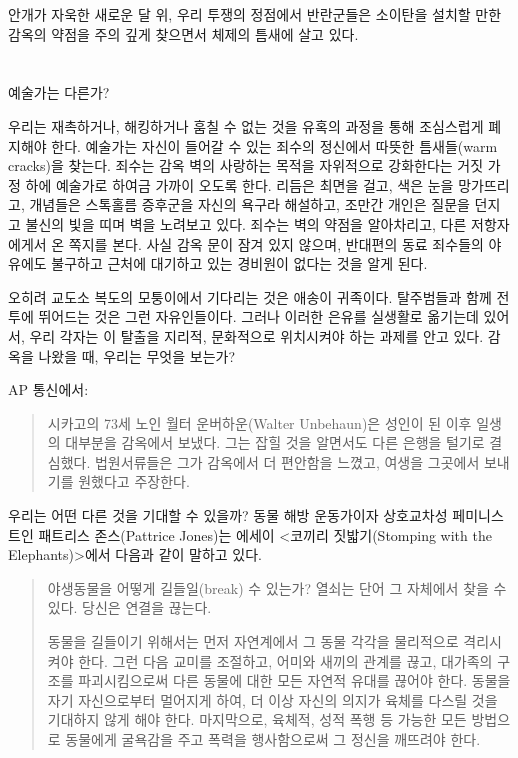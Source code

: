 \documentclass[10pt, b6paper, openany]{memoir}
\begin{document}
\begin{article}
안개가 자욱한 새로운 달 위, 우리 투쟁의 정점에서 반란군들은 소이탄을 설치할 만한 감옥의 약점을 주의 깊게 찾으면서 체제의 틈새에 살고 있다.

\section{}

예술가는 다른가?

우리는 재촉하거나, 해킹하거나 훔칠 수 없는 것을 유혹의 과정을 통해 조심스럽게 폐지해야 한다. 예술가는 자신이 들어갈 수 있는 죄수의 정신에서 따뜻한 틈새들(warm cracks)을 찾는다. 죄수는 감옥 벽의 사랑하는 목적을 자위적으로 강화한다는 거짓 가정 하에 예술가로 하여금 가까이 오도록 한다. 리듬은 최면을 걸고, 색은 눈을 망가뜨리고, 개념들은 스톡홀름 증후군을 자신의 욕구라 해설하고, 조만간 개인은 질문을 던지고 불신의 빛을 띠며 벽을 노려보고 있다. 죄수는 벽의 약점을 알아차리고, 다른 저항자에게서 온 쪽지를 본다. 사실 감옥 문이 잠겨 있지 않으며, 반대편의 동료 죄수들의 야유에도 불구하고 근처에 대기하고 있는 경비원이 없다는 것을 알게 된다. 

오히려 교도소 복도의 모퉁이에서 기다리는 것은 애송이 귀족이다. 탈주범들과 함께 전투에 뛰어드는 것은 그런 자유인들이다. 그러나 이러한 은유를 실생활로 옮기는데 있어서, 우리 각자는 이 탈출을 지리적, 문화적으로 위치시켜야 하는 과제를 안고 있다. 감옥을 나왔을 때, 우리는 무엇을 보는가?

AP 통신에서: 

\begin{quote}
시카고의 73세 노인 월터 운버하운(Walter Unbehaun)은 성인이 된 이후 일생의 대부분을 감옥에서 보냈다. 그는 잡힐 것을 알면서도 다른 은행을 털기로 결심했다. 법원서류들은 그가 감옥에서 더 편안함을 느꼈고, 여생을 그곳에서 보내기를 원했다고 주장한다.\cite{atcl:ap2013}
\end{quote}

우리는 어떤 다른 것을 기대할 수 있을까? 동물 해방 운동가이자 상호교차성 페미니스트인 패트리스 존스(Pattrice Jones)는 에세이 <코끼리 짓밟기(Stomping with the Elephants)>\cite{ibk:pattrice2006}에서 다음과 같이 말하고 있다. 

\begin{quote}
야생동물을 어떻게 길들일(break) 수 있는가? 열쇠는 단어 그 자체에서 찾을 수 있다. 당신은 연결을 끊는다. 

동물을 길들이기 위해서는 먼저 자연계에서 그 동물 각각을 물리적으로 격리시켜야 한다. 그런 다음 교미를 조절하고, 어미와 새끼의 관계를 끊고, 대가족의 구조를 파괴시킴으로써 다른 동물에 대한 모든 자연적 유대를 끊어야 한다. 동물을 자기 자신으로부터 멀어지게 하여, 더 이상 자신의 의지가 육체를 다스릴 것을 기대하지 않게 해야 한다. 마지막으로, 육체적, 성적 폭행 등 가능한 모든 방법으로 동물에게 굴욕감을 주고 폭력을 행사함으로써 그 정신을 깨뜨려야 한다. 


\end{quote}
\end{article}
\end{document}
